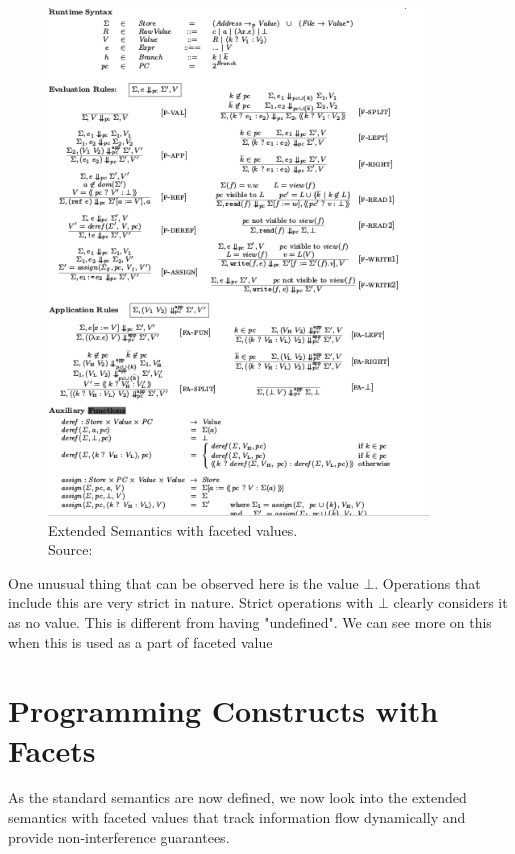 \begin{figure}
\centering
\includegraphics[width=0.90\textwidth]{images/fig7.png}
\caption[Extended Semantics with faceted values.]{Extended Semantics with faceted values. \\Source: ~\cite{bib4} } 
\label{fig:ExtendedSource_semantics_facetV}
\end{figure}

One unusual thing that can be observed here is the value $\bot$. Operations that include this are very strict in nature. Strict operations with $\bot$ clearly considers it as no value. This is different from having "undefined". We can see more on this when this is used as a part of faceted value
 
\section{Programming Constructs with Facets}
As the standard semantics are now defined, we now look into the extended semantics with faceted values that track information flow dynamically and provide non-interference
guarantees.

